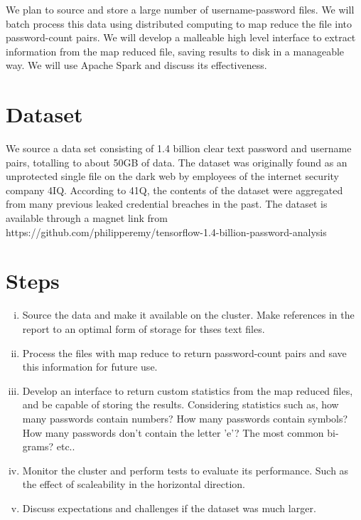 \documentclass{article}
\begin{document}
\begin{multicols}{2}
{\color{red}

We plan to source and store a large number of username-password files. We will batch process this data using distributed computing to map reduce the file into password-count pairs. We will develop a malleable high level interface to extract information from the map reduced file, saving results to disk in a manageable way.  We will use Apache Spark and discuss its effectiveness.

\section*{Dataset}
We source a data set consisting of 1.4 billion clear text password and username pairs, totalling to about 50GB of data. The dataset was originally found as an unprotected single file on the dark web by employees of the internet security company 4IQ. According to 41Q, the contents of the dataset were aggregated from many previous leaked credential breaches in the past. The dataset is available through a magnet link from https://github.com/philipperemy/tensorflow-1.4-billion-password-analysis

\section*{Steps}

\begin{enumerate}[(i)]

\item Source the data and make it available on the cluster. Make references in the report to an optimal form of storage for thses text files.
\item Process the files with map reduce to return password-count pairs and save this information for future use.
\item Develop an interface to return custom statistics from the map reduced files, and be capable of storing the results. Considering statistics such as, how many passwords contain numbers? How many passwords contain symbols? How many passwords don't contain the letter 'e'? The most common bi-grams? etc..
\item Monitor the cluster and perform tests to evaluate its performance. Such as the effect of scaleability in the horizontal direction.
\item Discuss expectations and challenges if the dataset was much larger.

\end{enumerate}
}



\printbibliography

\end{multicols}
\end{document}
